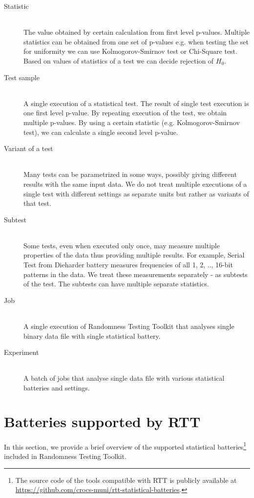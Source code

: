 \documentclass[
	digital,    %
	oneside,
	color,
	11pt,
	nocover,
	notable,
	nolof,
	nolot,
]{fithesis3}
\theoremstyle{definition}
\theoremstyle{remark}
\begin{document}
\begin{description}
\pagebreak

\item[Statistic] \hfill \\
The value obtained by certain calculation from first level p-values. Multiple statistics can be obtained from one set of p-values e.g. when testing the set for uniformity we can use Kolmogorov-Smirnov test or Chi-Square test. Based on values of statistics of a test we can decide rejection of $H_0$.

\item[Test sample] \hfill \\
A single execution of a statistical test. The result of single test execution is one first level p-value. By repeating execution of the test, we obtain multiple p-values. By using a certain statistic (e.g. Kolmogorov-Smirnov test), we can calculate a single second level p-value.

\item[Variant of a test] \hfill \\
Many tests can be parametrized in some ways, possibly giving different results with the same input data. We do not treat multiple executions of a single test with different settings as separate units but rather as variants of that test.

\item[Subtest] \hfill \\
Some tests, even when executed only once, may measure multiple properties of the data thus providing multiple results. For example, Serial Test from Dieharder battery measures frequencies of all 1, 2, .., 16-bit patterns in the data. We treat these measurements separately - as subtests of the test. The subtests can have multiple separate statistics.

\item[Job] \hfill \\
A single execution of Randomness Testing Toolkit that analyses single binary data file with single statistical battery.

\item[Experiment] \hfill \\
A batch of jobs that analyse single data file with various statistical batteries and settings.

\end{description}

\section{Batteries supported by RTT}
In this section, we provide a brief overview of the supported statistical batteries\footnote{The source code of the tools compatible with RTT is publicly available at \url{https://github.com/crocs-muni/rtt-statistical-batteries}.} included in Randomness Testing Toolkit.
\end{document}
